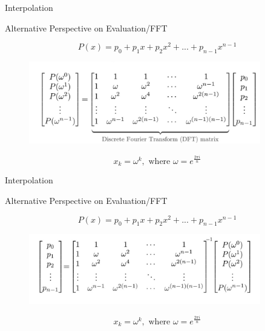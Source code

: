 \documentclass{beamer}
\begin{document}
        \begin{frame}{Interpolation}
        
    Alternative Perspective on Evaluation/FFT

    $$P(x) = p_0 + p_1x + p_2x^2 + ... + p_{n-1}x^{n-1}$$
    
    \begin{figure}
        \centering
        \includegraphics[width=0.9\textwidth]{dft.jpg}
       
        \label{fig:enter-label}
    \end{figure}
    
$$ x_k = \omega^k, \text{ where } \omega = e^{\frac{2\pi i}{n}} $$
\end{frame}
        \begin{frame}{Interpolation}
        
    Alternative Perspective on Evaluation/FFT

    $$P(x) = p_0 + p_1x + p_2x^2 + ... + p_{n-1}x^{n-1}$$
    
    \begin{figure}
        \centering
        \includegraphics[width=0.9\textwidth]{inverse.jpg}
        
        \label{fig:enter-label}
    \end{figure}
    
$$ x_k = \omega^k, \text{ where } \omega = e^{\frac{2\pi i}{n}} $$
\end{frame}
\end{document}
